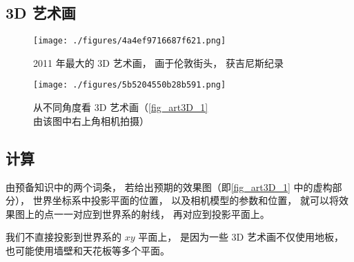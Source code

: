 
\begin{issues}
\issueNeedCite
\issueDraft
\end{issues}

\subsection{3D 艺术画}

\begin{figure}[ht]
\centering
\texttt{[image: ./figures/4a4ef9716687f621.png]}
\caption{2011 年最大的 3D 艺术画， 画于伦敦街头， 获吉尼斯纪录} \label{fig_art3D_1}
\end{figure}

\begin{figure}[ht]
\centering
\texttt{[image: ./figures/5b5204550b28b591.png]}
\caption{从不同角度看 3D 艺术画（\autoref{fig_art3D_1} 由该图中右上角相机拍摄）} \label{fig_art3D_2}
\end{figure}

\subsection{计算}


由预备知识中的两个词条， 若给出预期的效果图（即\autoref{fig_art3D_1} 中的虚构部分）， 世界坐标系中投影平面的位置， 以及相机模型的参数和位置， 就可以将效果图上的点一一对应到世界系的射线， 再对应到投影平面上。

我们不直接投影到世界系的 $xy$ 平面上， 是因为一些 3D 艺术画不仅使用地板， 也可能使用墙壁和天花板等多个平面。


